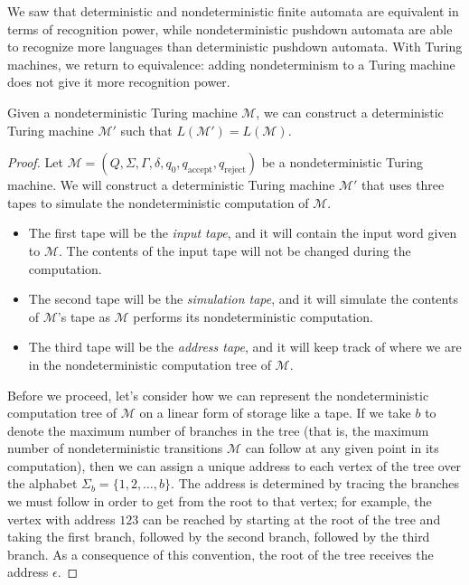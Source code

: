 We saw that deterministic and nondeterministic finite automata are equivalent in terms of recognition power, while nondeterministic pushdown automata are able to recognize more languages than deterministic pushdown automata. With Turing machines, we return to equivalence: adding nondeterminism to a Turing machine does not give it more recognition power.

\begin{theorem}\label{thm:NTMDTMequivalent}
Given a nondeterministic Turing machine $\mathcal{M}$, we can construct a deterministic Turing machine $\mathcal{M}'$ such that $L(\mathcal{M}') = L(\mathcal{M})$.

\begin{proof}
Let $\mathcal{M} = (Q, \Sigma, \Gamma, \delta, q_{0}, q_{\text{accept}}, q_{\text{reject}})$ be a nondeterministic Turing machine. We will construct a deterministic Turing machine $\mathcal{M}'$ that uses three tapes to simulate the nondeterministic computation of $\mathcal{M}$.
\begin{itemize}
\item The first tape will be the \emph{input tape}, and it will contain the input word given to $\mathcal{M}$. The contents of the input tape will not be changed during the computation.
\item The second tape will be the \emph{simulation tape}, and it will simulate the contents of $\mathcal{M}$'s tape as $\mathcal{M}$ performs its nondeterministic computation.
\item The third tape will be the \emph{address tape}, and it will keep track of where we are in the nondeterministic computation tree of $\mathcal{M}$.
\end{itemize}
Before we proceed, let's consider how we can represent the nondeterministic computation tree of $\mathcal{M}$ on a linear form of storage like a tape. If we take $b$ to denote the maximum number of branches in the tree (that is, the maximum number of nondeterministic transitions $\mathcal{M}$ can follow at any given point in its computation), then we can assign a unique address to each vertex of the tree over the alphabet $\Sigma_{b} = \{1, 2, \dots, b\}$. The address is determined by tracing the branches we must follow in order to get from the root to that vertex; for example, the vertex with address $123$ can be reached by starting at the root of the tree and taking the first branch, followed by the second branch, followed by the third branch. As a consequence of this convention, the root of the tree receives the address $\epsilon$.


\end{proof}
\end{theorem}
